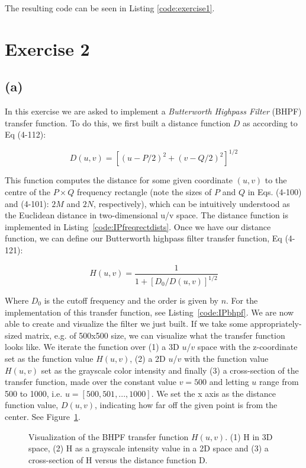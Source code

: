 \documentclass{article}
\begin{document}
The resulting code can be seen in  Listing \ref{code:exercise1}.

\section*{Exercise 2}
\subsection*{(a)} In this exercise we are asked to implement a \textit{Butterworth Highpass Filter} (BHPF) transfer function. To do this, we first built a distance function $D$ as according to Eq (4-112):

\[
D(u,v)=[(u-P/2)^2+(v-Q/2)^2]^{1/2}
\]

This function computes the distance for some given coordinate $(u, v)$ to the centre of the $P \times Q$ frequency rectangle (note the sizes of $P$ and $Q$ in Eqs. (4-100) and (4-101): $2M$ and $2N$, respectively), which can be intuitively understood as the Euclidean distance in two-dimensional u/v space. The distance function is implemented in  Listing~\ref{code:IPfreqrectdists}. Once we have our distance function, we can define our Butterworth highpass filter transfer function, Eq (4-121):

\[
H(u, v) = \frac{1}{1+[D_0 / D(u, v)]^{1/2}}
\]

Where $D_0$ is the cutoff frequency and the order is given by $n$. For the implementation of this transfer function, see  Listing~\ref{code:IPbhpf}. We are now able to create and visualize the filter we just built. If we take some appropriately-sized matrix, e.g. of 500x500 size, we can visualize what the transfer function looks like. We iterate the function over (1) a 3D $u$/$v$ space with the z-coordinate set as the function value $H(u, v)$, (2) a 2D $u$/$v$ with the function value $H(u, v)$ set as the grayscale color intensity and finally (3) a cross-section of the transfer function, made over the constant value $v = 500$ and letting $u$ range from 500 to 1000, i.e. $u = [500, 501, ..., 1000]$. We set the x axis as the distance function value, $D(u, v)$, indicating how far off the given point is from the center. See Figure~\ref{fig:bhpf}.

\begin{figure}[ht]
    \centering
    
    \caption{Visualization of the BHPF transfer function $H(u, v)$. (1) H in 3D space, (2) H as a grayscale intensity value in a 2D space and (3) a cross-section of H versus the distance function D.}
    \label{fig:bhpf}
\end{figure}
\end{document}

